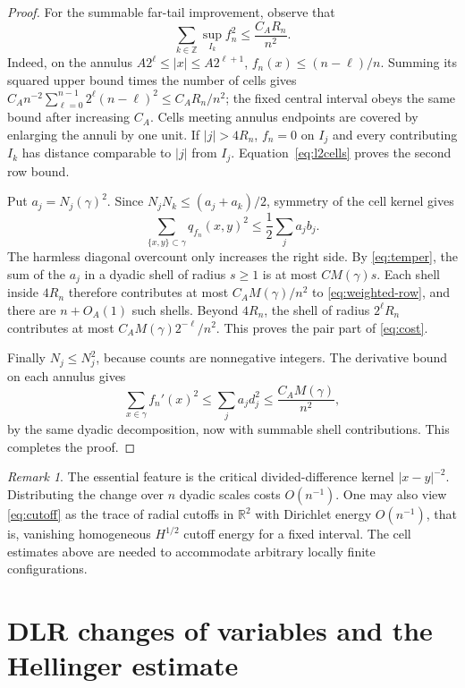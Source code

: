 \documentclass[11pt,reqno]{amsart}
\numberwithin{equation}{section}
\theoremstyle{definition}
\theoremstyle{remark}
\newtheorem{remark}[theorem]{Remark}
\newcommand{\R}{\mathbb R}
\newcommand{\Z}{\mathbb Z}
\newcommand{\1}{\mathbf1}
\begin{document}
\begin{proof}
For the summable far-tail improvement, observe that
\begin{equation}\label{eq:l2cells}
\sum_{k\in\Z}\sup_{I_k}f_n^2\le\frac{C_A R_n}{n^2}.
\end{equation}
Indeed, on the annulus $A2^\ell\le|x|\le A2^{\ell+1}$,
$f_n(x)\le(n-\ell)/n$. Summing its squared upper bound times the
number of cells gives
$C_A n^{-2}\sum_{\ell=0}^{n-1}2^\ell(n-\ell)^2
\le C_A R_n/n^2$; the fixed central interval obeys the same bound
after increasing $C_A$. Cells meeting annulus endpoints are covered
by enlarging the annuli by one unit. If $|j|>4R_n$, $f_n=0$ on $I_j$
and every contributing $I_k$ has distance comparable to $|j|$ from
$I_j$. Equation~\eqref{eq:l2cells} proves the second row bound.

Put $a_j=N_j(\gamma)^2$. Since
$N_jN_k\le(a_j+a_k)/2$, symmetry of the cell kernel gives
\begin{equation}\label{eq:weighted-row}
\sum_{\{x,y\}\subset\gamma}q_{f_n}(x,y)^2
\le\frac12\sum_j a_j b_j.
\end{equation}
The harmless diagonal overcount only increases the right side.
By \eqref{eq:temper}, the sum of the $a_j$ in a dyadic shell of
radius $s\ge1$ is at most $C M(\gamma)s$.
Each shell inside $4R_n$ therefore contributes at most
$C_A M(\gamma)/n^2$ to \eqref{eq:weighted-row}, and there are
$n+O_A(1)$ such shells. Beyond $4R_n$, the shell of radius $2^\ell R_n$
contributes at most $C_A M(\gamma)2^{-\ell}/n^2$.
This proves the pair part of \eqref{eq:cost}.

Finally $N_j\le N_j^2$, because counts are nonnegative integers.
The derivative bound on each annulus gives
\[
\sum_{x\in\gamma}f_n'(x)^2
\le\sum_j a_jd_j^2
\le\frac{C_A M(\gamma)}{n^2},
\]
by the same dyadic decomposition, now with summable shell contributions.
This completes the proof.
\end{proof}

\begin{remark}
The essential feature is the critical divided-difference kernel
$|x-y|^{-2}$. Distributing the change over $n$ dyadic scales costs
$O(n^{-1})$. One may also view \eqref{eq:cutoff} as the trace of radial
cutoffs in $\R^2$ with Dirichlet energy $O(n^{-1})$, that is, vanishing
homogeneous $H^{1/2}$ cutoff energy for a fixed interval. The cell estimates above are
needed to accommodate arbitrary locally finite configurations.
\end{remark}

\section{DLR changes of variables and the Hellinger estimate}
\end{document}
